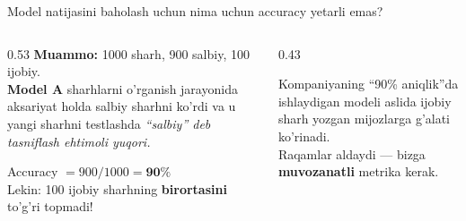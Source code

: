 \documentclass[aspectratio=169,11pt]{beamer}
\begin{document}
\begin{frame}{Model natijasini baholash uchun nima uchun accuracy yetarli emas?}
  \begin{columns}[T]
    \begin{column}{0.53\textwidth}
      \small
      \textbf{Muammo:} 1000 sharh, 900 salbiy, 100 ijobiy.\\[6pt]
      \textbf{Model A} sharhlarni o'rganish jarayonida aksariyat holda salbiy sharhni ko'rdi va u yangi sharhni testlashda \textit{``salbiy'' deb tasniflash ehtimoli yuqori.}\\[5pt]
      \begin{tcolorbox}[warnbox]
        \small
        Accuracy $= 900/1000 = \mathbf{90\%}$\\[2pt]
        Lekin: 100 ijobiy sharhning
        \textbf{birortasini} to'g'ri topmadi!
      \end{tcolorbox}
    \end{column}
    \begin{column}{0.43\textwidth}
      \vspace{8pt}
      \begin{tcolorbox}[defbox,title=Muammo]
        \small
        Kompaniyaning ``90\% aniqlik''da ishlaydigan modeli
        aslida ijobiy sharh yozgan mijozlarga g'alati ko'rinadi.\\[4pt]
        Raqamlar aldaydi ---
        bizga \textbf{muvozanatli}
        metrika kerak.
      \end{tcolorbox}
    \end{column}
  \end{columns}
\end{frame}
\end{document}
